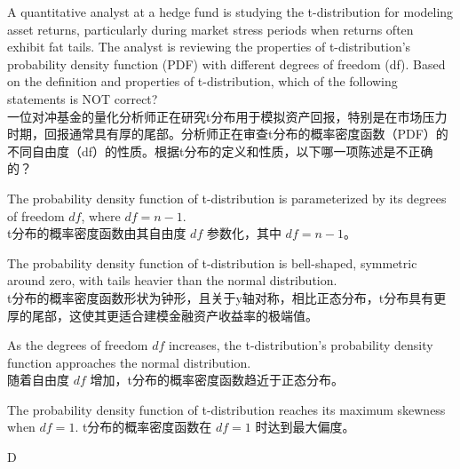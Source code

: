 \documentclass{article}
\newcounter{question} %
\begin{document}
        \begin{question}
            A quantitative analyst at a hedge fund is studying the t-distribution for modeling asset returns, particularly during market stress periods when returns often exhibit fat tails. The analyst is reviewing the properties of t-distribution's probability density function (PDF) with different degrees of freedom (df). Based on the definition and properties of t-distribution, which of the following statements is NOT correct?\\
            一位对冲基金的量化分析师正在研究t分布用于模拟资产回报，特别是在市场压力时期，回报通常具有厚的尾部。分析师正在审查t分布的概率密度函数（PDF）的不同自由度（df）的性质。根据t分布的定义和性质，以下哪一项陈述是不正确的？
        \end{question}
        
        \begin{choices}
            \item The probability density function of t-distribution is parameterized by its degrees of freedom \(df\), where \(df = n-1\).\\
            t分布的概率密度函数由其自由度 \(df\) 参数化，其中 \(df = n-1\)。
            \item The probability density function of t-distribution is bell-shaped, symmetric around zero, with tails heavier than the normal distribution.\\
            t分布的概率密度函数形状为钟形，且关于y轴对称，相比正态分布，t分布具有更厚的尾部，这使其更适合建模金融资产收益率的极端值。
            \item As the degrees of freedom \(df\) increases, the t-distribution's probability density function approaches the normal distribution.\\
            随着自由度 \(df\) 增加，t分布的概率密度函数趋近于正态分布。
            \item The probability density function of t-distribution reaches its maximum skewness when \(df = 1\).
            t分布的概率密度函数在 \(df = 1\) 时达到最大偏度。
        \end{choices}
        
        \begin{correctanswer}
            D
        \end{correctanswer}
        
\end{document}
